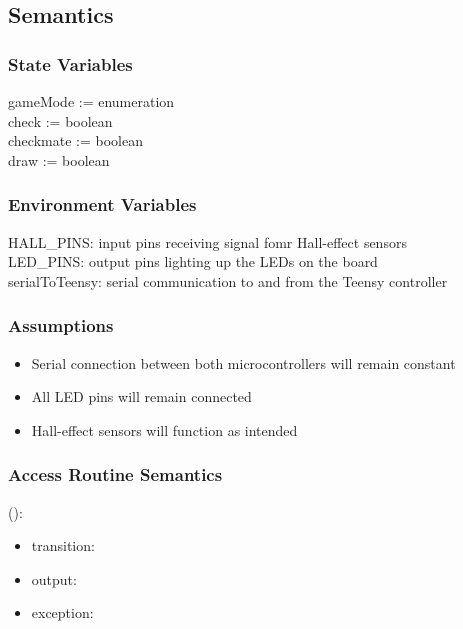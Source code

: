 \documentclass[12pt, titlepage]{article}
\begin{document}
\subsection{Semantics}

\subsubsection{State Variables}{
  gameMode := enumeration\\
  check := boolean\\
  checkmate := boolean\\
  draw := boolean\\
}

\subsubsection{Environment Variables}{
  HALL\_PINS: input pins receiving signal fomr Hall-effect sensors\\
  LED\_PINS: output pins lighting up the LEDs on the board\\
  serialToTeensy: serial communication to and from the Teensy controller\\
}

\subsubsection{Assumptions}{
  \begin{itemize}
    \item Serial connection between both microcontrollers will remain constant
    \item All LED pins will remain connected
    \item Hall-effect sensors will function as intended
  \end{itemize}
}


\subsubsection{Access Routine Semantics}

\noindent {}():
\begin{itemize}
\item transition:  
\item output:  
\item exception:  
\end{itemize}
\end{document}
